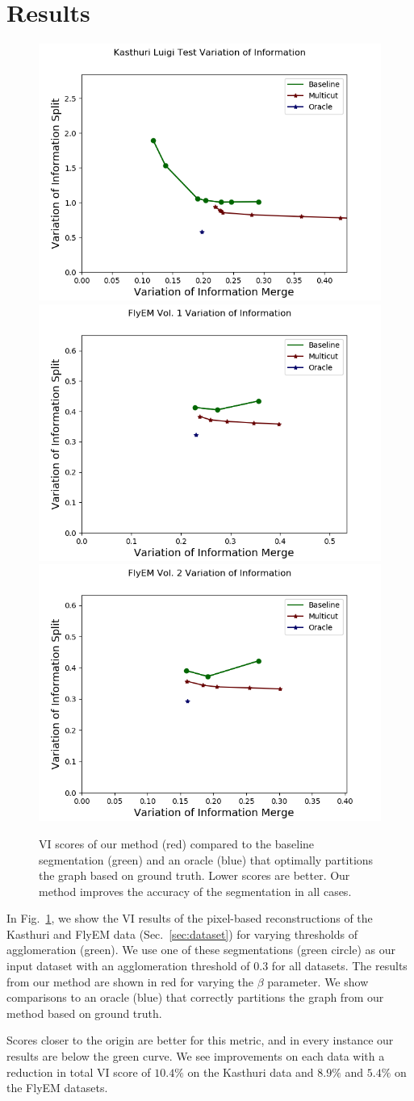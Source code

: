 \section{Results}

\begin{figure}[t!]
	\centering
	\includegraphics[width=0.32\linewidth]{./figures/voi-Kasthuri-Luigi-Test.png}
	\includegraphics[width=0.32\linewidth]{./figures/voi-FlyEM-Vol--1.png}
	\includegraphics[width=0.32\linewidth]{./figures/voi-FlyEM-Vol--2.png}
	\caption{VI scores of our method (red) compared to the baseline segmentation (green) and an oracle (blue) that optimally partitions the graph based on ground truth. Lower scores are better. Our method improves the accuracy of the segmentation in all cases.}
	\label{fig:variation-of-information}
\end{figure}

In Fig.~\ref{fig:variation-of-information}, we show the VI results of the pixel-based reconstructions of the Kasthuri and FlyEM data (Sec.~\ref{sec:dataset}) for varying thresholds of agglomeration (green). 
We use one of these segmentations (green circle) as our input dataset with an agglomeration threshold of 0.3 for all datasets. 
The results from our method are shown in red for varying the $\beta$ parameter. 
We show comparisons to an oracle (blue) that correctly partitions the graph from our method based on ground truth.

Scores closer to the origin are better for this metric, and in every instance our results are below the green curve.
We see improvements on each data with a reduction in total VI score of $10.4\%$ on the Kasthuri data and $8.9\%$ and $5.4\%$ on the FlyEM datasets.

